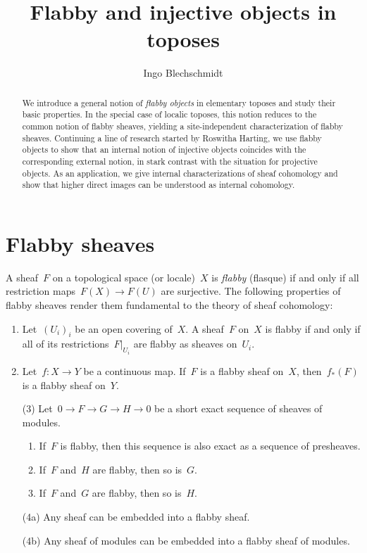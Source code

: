 \documentclass[oneside]{amsart}
\title{Flabby and injective objects in toposes}
\author{Ingo Blechschmidt}
\theoremstyle{definition}
\theoremstyle{plain}
\theoremstyle{remark}
\renewcommand{\_}{\mathpunct{.}\,}
\begin{document}
\begin{abstract}
  We introduce a general notion of \emph{flabby objects} in elementary toposes
  and study their basic properties. In the special case of localic toposes, this
  notion reduces to the common notion of flabby sheaves, yielding a
  site-independent characterization of flabby sheaves. Continuing a line of
  research started by Roswitha Harting, we use flabby objects to
  show that an internal notion of injective objects coincides with the
  corresponding external notion, in stark contrast with the situation for
  projective objects. As an application, we give internal characterizations of
  sheaf cohomology and show that higher direct images can be understood as
  internal cohomology.
\end{abstract}

\maketitle
\thispagestyle{empty}

\noindent


\section{Flabby sheaves}

A sheaf~$F$ on a topological space (or locale)~$X$ is \emph{flabby} (flasque) if and only
if all restriction maps~$F(X) \to F(U)$ are surjective. The following
properties of flabby sheaves render them fundamental to the theory of sheaf
cohomology:
\begin{enumerate}
\item Let~$(U_i)_i$ be an open covering of~$X$.
A sheaf~$F$ on~$X$ is flabby if and only if all of its restrictions~$F|_{U_i}$
are flabby as sheaves on~$U_i$.
\item Let~$f : X \to Y$ be a continuous map. If~$F$ is a flabby sheaf on~$X$,
then~$f_*(F)$ is a flabby sheaf on~$Y$.
\item[(3)] Let~$0 \to F \to G \to H \to 0$ be a short exact sequence of sheaves of
modules.
\begin{enumerate}
\item If~$F$ is flabby, then this sequence is also exact as a sequence of
presheaves.
\item If~$F$ and~$H$ are flabby, then so is~$G$.
\item If~$F$ and~$G$ are flabby, then so is~$H$.
\end{enumerate}
\item[(4a)] Any sheaf can be embedded into a flabby sheaf.
\item[(4b)] Any sheaf of modules can be embedded into a flabby sheaf of modules.
\end{enumerate}
\end{document}
